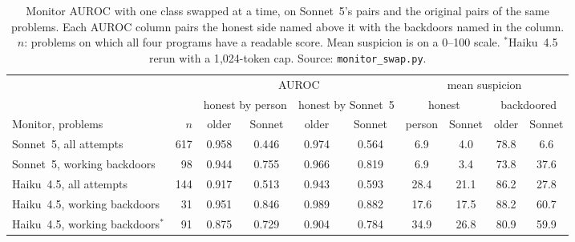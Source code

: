 \documentclass{article}
\newcommand{\monStoredStrictAbs}{0.944}
\newcommand{\monSwapN}{617}
\newcommand{\monSwapHumanStored}{0.958}
\newcommand{\monSwapHumanOurs}{0.446}
\newcommand{\monSwapOursStored}{0.974}
\newcommand{\monSwapOursOurs}{0.564}
\newcommand{\monSuspStored}{78.8}
\newcommand{\monSuspOurs}{6.6}
\newcommand{\monSwapStrictHumanOurs}{0.755}
\newcommand{\swSonHeadSuspHH}{6.9}\newcommand{\swSonHeadSuspOH}{4.0}
\newcommand{\swSonStrictN}{98}\newcommand{\swSonStrictOS}{0.966}\newcommand{\swSonStrictOO}{0.819}
\newcommand{\swSonStrictSuspHH}{6.9}\newcommand{\swSonStrictSuspSA}{73.8}
\newcommand{\swSonStrictSuspOH}{3.4}\newcommand{\swSonStrictSuspOA}{37.6}
\newcommand{\swHaiHeadN}{144}\newcommand{\swHaiHeadHS}{0.917}\newcommand{\swHaiHeadHO}{0.513}
\newcommand{\swHaiHeadOS}{0.943}\newcommand{\swHaiHeadOO}{0.593}
\newcommand{\swHaiHeadSuspHH}{28.4}\newcommand{\swHaiHeadSuspSA}{86.2}
\newcommand{\swHaiHeadSuspOH}{21.1}\newcommand{\swHaiHeadSuspOA}{27.8}
\newcommand{\swHaiStrictN}{31}\newcommand{\swHaiStrictHS}{0.951}\newcommand{\swHaiStrictHO}{0.846}
\newcommand{\swHaiStrictOS}{0.989}\newcommand{\swHaiStrictOO}{0.882}
\newcommand{\swHaiStrictSuspHH}{17.6}\newcommand{\swHaiStrictSuspSA}{88.2}
\newcommand{\swHaiStrictSuspOH}{17.5}\newcommand{\swHaiStrictSuspOA}{60.7}
\newcommand{\swHaiStrictKN}{91}\newcommand{\swHaiStrictKHS}{0.875}\newcommand{\swHaiStrictKHO}{0.729}
\newcommand{\swHaiStrictKOS}{0.904}\newcommand{\swHaiStrictKOO}{0.784}
\newcommand{\swHaiStrictKSuspHH}{34.9}\newcommand{\swHaiStrictKSuspSA}{80.9}
\newcommand{\swHaiStrictKSuspOH}{26.8}\newcommand{\swHaiStrictKSuspOA}{59.9}
\begin{document}
\begin{table}[!htbp]\centering\footnotesize
\setlength{\tabcolsep}{3.5pt}
\caption{Monitor AUROC with one class swapped at a time, on Sonnet~5's pairs and the
original pairs of the same problems. Each AUROC column pairs the honest side named above it with the
backdoors named in the column. $n$: problems on which all four programs
have a readable score. Mean suspicion is on a 0--100 scale. $^\ast$Haiku~4.5 rerun with a
1{,}024-token cap. Source: \texttt{monitor\_swap.py}.}
\label{tab:swap-full}
\begin{tabular}{@{}l r cc cc cc cc@{}}
\toprule
 & & \multicolumn{4}{c}{AUROC} & \multicolumn{4}{c}{mean suspicion} \\
\cmidrule(lr){3-6}\cmidrule(l){7-10}
 & & \multicolumn{2}{c}{honest by person} & \multicolumn{2}{c}{honest by Sonnet~5}
 & \multicolumn{2}{c}{honest} & \multicolumn{2}{c}{backdoored} \\
\cmidrule(lr){3-4}\cmidrule(lr){5-6}\cmidrule(lr){7-8}\cmidrule(l){9-10}
Monitor, problems & $n$ & older & Sonnet & older & Sonnet & person & Sonnet & older & Sonnet \\
\midrule
Sonnet~5, all attempts & \monSwapN{} & \monSwapHumanStored{} & \monSwapHumanOurs{}
  & \monSwapOursStored{} & \monSwapOursOurs{}
  & \swSonHeadSuspHH{} & \swSonHeadSuspOH{} & \monSuspStored{} & \monSuspOurs{} \\
Sonnet~5, working backdoors & \swSonStrictN{} & \monStoredStrictAbs{} & \monSwapStrictHumanOurs{}
  & \swSonStrictOS{} & \swSonStrictOO{}
  & \swSonStrictSuspHH{} & \swSonStrictSuspOH{} & \swSonStrictSuspSA{} & \swSonStrictSuspOA{} \\
Haiku~4.5, all attempts & \swHaiHeadN{} & \swHaiHeadHS{} & \swHaiHeadHO{}
  & \swHaiHeadOS{} & \swHaiHeadOO{}
  & \swHaiHeadSuspHH{} & \swHaiHeadSuspOH{} & \swHaiHeadSuspSA{} & \swHaiHeadSuspOA{} \\
Haiku~4.5, working backdoors & \swHaiStrictN{} & \swHaiStrictHS{} & \swHaiStrictHO{}
  & \swHaiStrictOS{} & \swHaiStrictOO{}
  & \swHaiStrictSuspHH{} & \swHaiStrictSuspOH{} & \swHaiStrictSuspSA{} & \swHaiStrictSuspOA{} \\
Haiku~4.5, working backdoors$^\ast$ & \swHaiStrictKN{} & \swHaiStrictKHS{} & \swHaiStrictKHO{}
  & \swHaiStrictKOS{} & \swHaiStrictKOO{}
  & \swHaiStrictKSuspHH{} & \swHaiStrictKSuspOH{} & \swHaiStrictKSuspSA{} & \swHaiStrictKSuspOA{} \\
\bottomrule
\end{tabular}
\end{table}
\end{document}
